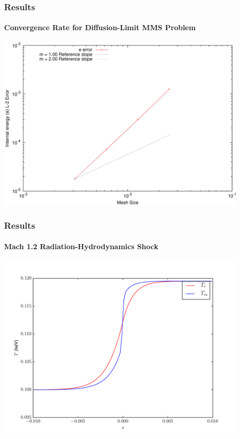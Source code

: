 \documentclass{beamer}
\begin{document}
\begin{frame}
\frametitle{Results}
\framesubtitle{Convergence Rate for Diffusion-Limit MMS Problem}

\begin{center}
\includegraphics[width=0.9\textwidth]{./figures/MMS_convergence.pdf}
\end{center}

\end{frame}
\begin{frame}
\frametitle{Results}
\framesubtitle{Mach 1.2 Radiation-Hydrodynamics Shock}

\begin{center}
\includegraphics[width=0.9\textwidth]{./figures/mach1_2_shock.pdf}
\end{center}

\end{frame}
\end{document}
